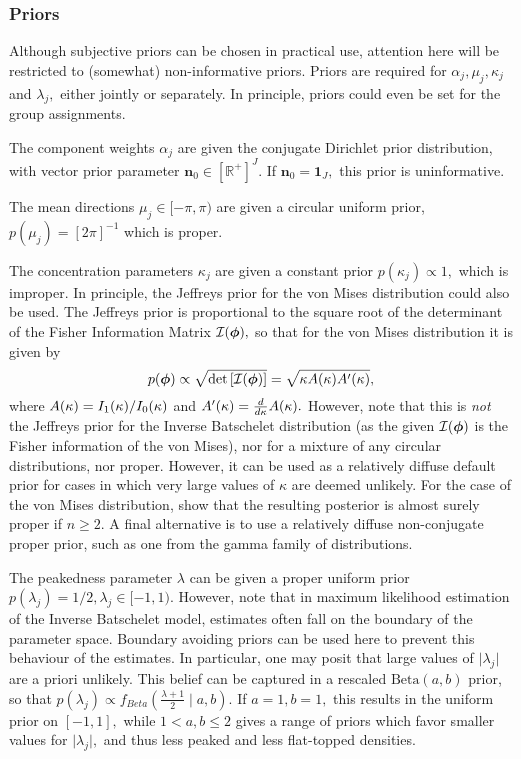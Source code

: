 \subsubsection{Priors}
\label{subsub:priors}

Although subjective priors can be chosen in practical use, attention here will be restricted to (somewhat) non-informative priors. Priors are required for \(\alpha_j, \mu_j, \kappa_j\) and \(\lambda_j,\) either jointly or separately. In principle, priors could even be set for the group assignments.

The component weights \(\alpha_j\) are given the conjugate Dirichlet prior distribution, with vector prior parameter \(\boldsymbol{n}_0 \in \left[\mathbb{R}^+\right]^{J}.\) If \(\boldsymbol{n}_0 = \boldsymbol{1}_J,\) this prior is uninformative.

The mean directions \(\mu_j \in [-\pi, \pi) \) are given a circular uniform prior, \(p(\mu_j) = [2\pi]^{-1}\) which is proper.

The concentration parameters \(\kappa_j\) are given a constant prior \(p(\kappa_j) \propto 1,\) which is improper. In principle, the Jeffreys prior for the von Mises distribution could also be used. The Jeffreys prior is proportional to the square root of the determinant of the Fisher Information Matrix \( \mathcal{I}(\boldsymbol{\phi}),\) so that for the von Mises distribution it is given by
\begin{equation}
  p(\boldsymbol{\phi}) \propto \sqrt{ \text{det}\left[ \mathcal{I}(\boldsymbol{\phi}) \right] } = \sqrt{\kappa A(\kappa) A'(\kappa) },
\end{equation}
where \( A(\kappa) = I_1(\kappa) / I_0(\kappa) \) and \( A'(\kappa) = \frac{d}{d \kappa} A(\kappa).\) However, note that this is \textit{not} the Jeffreys prior for the Inverse Batschelet distribution (as the given $\mathcal{I}(\boldsymbol{\phi})$ is the Fisher information of the von Mises), nor for a mixture of any circular distributions, nor proper. However, it can be used as a relatively diffuse default prior for cases in which very large values of \(\kappa\) are deemed unlikely. For the case of the von Mises distribution, \citet{hornik2013conjugate} show that the resulting posterior is almost surely proper if \(n \geq 2.\) A final alternative is to use a relatively diffuse non-conjugate proper prior, such as one from the gamma family of distributions.

The peakedness parameter \(\lambda\) can be given a proper uniform prior \(p(\lambda_j) = 1/2, \lambda_j \in [-1, 1).\) However, \citet{jones2012inverse} note that in maximum likelihood estimation of the Inverse Batschelet model, estimates often fall on the boundary of the parameter space. Boundary avoiding priors can be used here to prevent this behaviour of the estimates. In particular, one may posit that large values of \(\vert \lambda_j \vert\) are a priori unlikely. This belief can be captured in a rescaled \(\text{Beta}(a, b)\) prior, so that \(p(\lambda_j) \propto f_{Beta} \left(\frac{\lambda + 1}{2} \mid a, b\right).\) If \(a = 1, b = 1, \) this results in the uniform prior on \([-1, 1],\) while \(1 < a, b \leq 2\) gives a range of priors which favor smaller values for  \(\vert \lambda_j \vert,\) and thus less peaked and less flat-topped densities.


